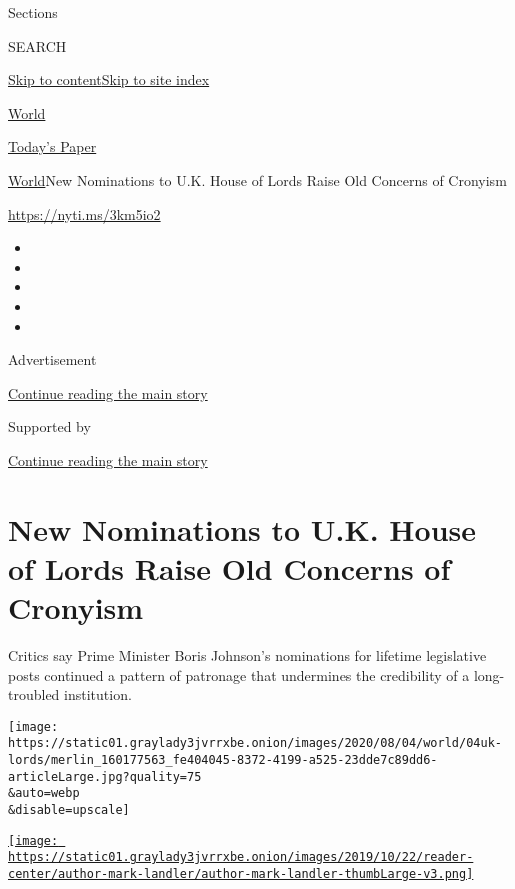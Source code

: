 Sections

SEARCH

\protect\hyperlink{site-content}{Skip to
content}\protect\hyperlink{site-index}{Skip to site index}

\href{https://www.nytimes3xbfgragh.onion/section/world}{World}

\href{https://myaccount.nytimes3xbfgragh.onion/auth/login?response_type=cookie\&client_id=vi}{}

\href{https://www.nytimes3xbfgragh.onion/section/todayspaper}{Today's
Paper}

\href{/section/world}{World}\textbar{}New Nominations to U.K. House of
Lords Raise Old Concerns of Cronyism

\url{https://nyti.ms/3km5io2}

\begin{itemize}
\item
\item
\item
\item
\item
\end{itemize}

Advertisement

\protect\hyperlink{after-top}{Continue reading the main story}

Supported by

\protect\hyperlink{after-sponsor}{Continue reading the main story}

\hypertarget{new-nominations-to-uk-house-of-lords-raise-old-concerns-of-cronyism}{%
\section{New Nominations to U.K. House of Lords Raise Old Concerns of
Cronyism}\label{new-nominations-to-uk-house-of-lords-raise-old-concerns-of-cronyism}}

Critics say Prime Minister Boris Johnson's nominations for lifetime
legislative posts continued a pattern of patronage that undermines the
credibility of a long-troubled institution.

\texttt{[image: https://static01.graylady3jvrrxbe.onion/images/2020/08/04/world/04uk-lords/merlin\_160177563\_fe404045-8372-4199-a525-23dde7c89dd6-articleLarge.jpg?quality=75\\\&auto=webp\\\&disable=upscale]}

\href{https://www.nytimes3xbfgragh.onion/by/mark-landler}{\texttt{[image: https://static01.graylady3jvrrxbe.onion/images/2019/10/22/reader-center/author-mark-landler/author-mark-landler-thumbLarge-v3.png]}}

